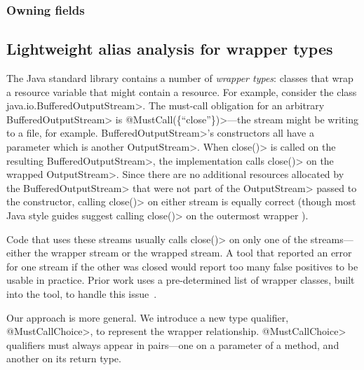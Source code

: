 
\subsubsection{Owning fields}
\label{sec:owning-fields}


\subsection{Lightweight alias analysis for wrapper types}
\label{sec:must-call-choice}

The Java standard library contains a number of \emph{wrapper types}:
classes that wrap a resource variable that might contain a resource.
For example, consider the class \<java.io.BufferedOutputStream>.  The
must-call obligation for an arbitrary \<BufferedOutputStream> is
\<@MustCall(\{``close''\})>---the stream might be writing to a file,
for example.  \<BufferedOutputStream>'s constructors all have a
parameter which is another \<OutputStream>. When \<close()> is called
on the resulting \<BufferedOutputStream>, the implementation calls
\<close()> on the wrapped \<OutputStream>. Since there are no
additional resources allocated by the \<BufferedOutputStream> that
were not part of the \<OutputStream> passed to the constructor,
calling \<close()> on either stream is equally correct (though most
Java style guides suggest calling \<close()> on the outermost
wrapper ).

Code that uses these streams usually calls \<close()> on only one
of the streams---either the wrapper stream or the wrapped stream.
A tool that reported an error for one stream if the other was closed
would report too many false positives to be usable in practice.
Prior work uses a pre-determined list of wrapper classes, built into
the tool, to handle this issue~\cite{TorlakC10}. 

Our approach is more general. We introduce a new type qualifier,
\<@MustCallChoice>, to represent the wrapper relationship. \<@MustCallChoice>
qualifiers must always appear in pairs---one on a parameter of a method,
and another on its return type.

